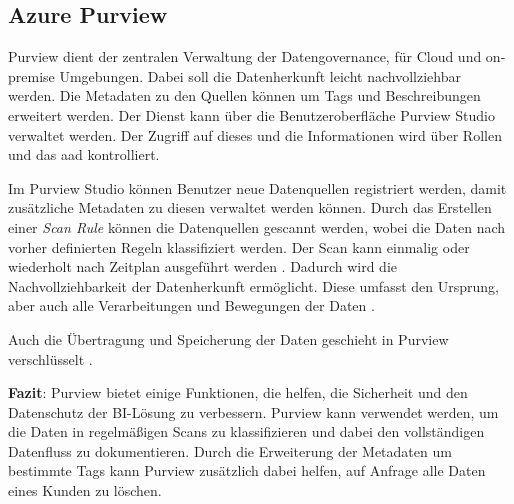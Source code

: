 \subsection{Azure Purview} \label{sec:grundlagen:azure_dienste:purview}
Purview dient der zentralen Verwaltung der Datengovernance, für Cloud und on-premise Umgebungen. Dabei soll die Datenherkunft leicht nachvollziehbar werden. Die Metadaten zu den Quellen können um Tags und Beschreibungen erweitert werden. Der Dienst kann über die Benutzeroberfläche Purview Studio verwaltet werden. Der Zugriff auf dieses und die Informationen wird über Rollen und das \ac{aad} kontrolliert.

Im Purview Studio können Benutzer neue Datenquellen registriert werden, damit zusätzliche Metadaten zu diesen verwaltet werden können. Durch das Erstellen einer \textit{Scan Rule} können die Datenquellen gescannt werden, wobei die Daten nach vorher definierten Regeln klassifiziert werden. Der Scan kann einmalig oder wiederholt nach Zeitplan ausgeführt werden \cite{lesteve_definitive_2021}. Dadurch wird die Nachvollziehbarkeit der Datenherkunft ermöglicht. Diese umfasst den Ursprung, aber auch alle Verarbeitungen und Bewegungen der Daten \cite{riscutia_data_2021}.

Auch die Übertragung und Speicherung der Daten geschieht in Purview verschlüsselt \cite{baldwin_azure_purview_2021}. 

\textbf{Fazit}: Purview bietet einige Funktionen, die helfen, die Sicherheit und den Datenschutz der BI-Lösung zu verbessern. Purview kann verwendet werden, um die Daten in regelmäßigen Scans zu klassifizieren und dabei den vollständigen Datenfluss zu dokumentieren. Durch die Erweiterung der Metadaten um bestimmte Tags kann Purview zusätzlich dabei helfen, auf Anfrage alle Daten eines Kunden zu löschen.

